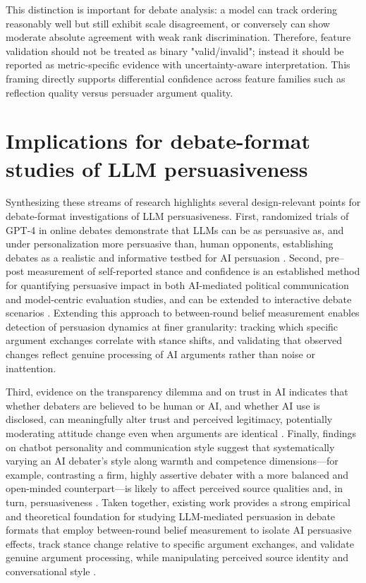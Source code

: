 This distinction is important for debate analysis: a model can track ordering
reasonably well but still exhibit scale disagreement, or conversely can show
moderate absolute agreement with weak rank discrimination. Therefore, feature
validation should not be treated as binary "valid/invalid"; instead it should
be reported as metric-specific evidence with uncertainty-aware interpretation.
This framing directly supports differential confidence across feature families
such as reflection quality versus persuader argument quality.

\section{Implications for debate-format studies of LLM persuasiveness}

Synthesizing these streams of research highlights several design-relevant points for debate-format
investigations of LLM persuasiveness. First, randomized trials of GPT\mbox{-}4 in online debates
demonstrate that LLMs can be as persuasive as, and under personalization more persuasive than,
human opponents, establishing debates as a realistic and informative testbed for AI persuasion
\cite{salvi2025_chatgpt_debates}. Second, pre--post measurement of self-reported stance and
confidence is an established method for quantifying persuasive impact in both AI-mediated political
communication and model-centric evaluation studies, and can be extended to interactive debate
 scenarios \cite{argyle2025_testing_political_persuasion,durmus2024_measuring_persuasiveness,pataranutaporn2025_oceanchat}.
Extending this approach to between-round belief measurement enables detection of persuasion
dynamics at finer granularity: tracking which specific argument exchanges correlate with stance
shifts, and validating that observed changes reflect genuine processing of AI arguments rather
than noise or inattention.

Third, evidence on the transparency dilemma and on trust in AI indicates that whether debaters are
believed to be human or AI, and whether AI use is disclosed, can meaningfully alter trust and
perceived legitimacy, potentially moderating attitude change even when arguments are identical
\cite{schilke2025_transparency_dilemma,montag2023_trust_humans_vs_ai}. Finally, findings on
chatbot personality and communication style suggest that systematically varying an AI debater's
style along warmth and competence dimensions---for example, contrasting a firm, highly assertive
debater with a more balanced and open-minded counterpart---is likely to affect perceived source
qualities and, in turn, persuasiveness
\cite{schwede2023_can_chatbots_be_persuasive,heppner2024_chatbot_personality_cues}. Taken
together, existing work provides a strong empirical and theoretical foundation for studying
LLM-mediated persuasion in debate formats that employ between-round belief measurement to
isolate AI persuasive effects, track stance change relative to specific argument exchanges,
and validate genuine argument processing, while manipulating perceived source identity and
conversational style \cite{salvi2025_chatgpt_debates,argyle2025_testing_political_persuasion,durmus2024_measuring_persuasiveness,schilke2025_transparency_dilemma,schwede2023_can_chatbots_be_persuasive}.

